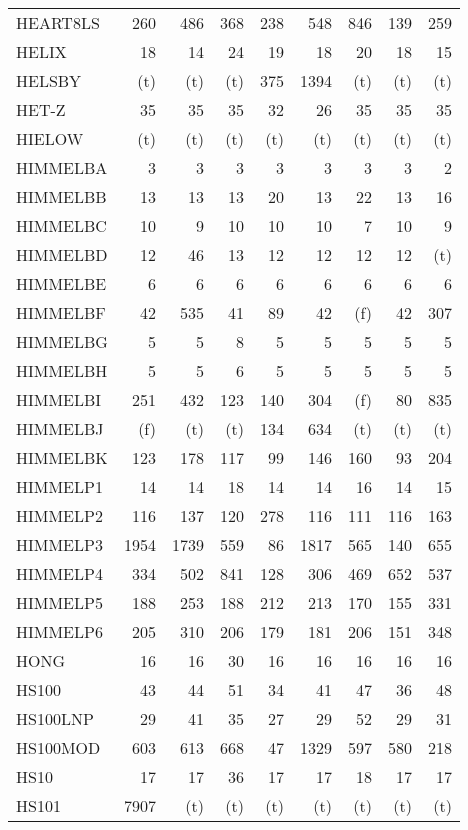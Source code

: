 \documentclass[11pt,twoside]{article}
\begin{document}
{\begin{longtable}[c]{|l|r|r|r|r|r|r|r|r|}
 HEART8LS & 260 & 486 & 368 & 238 & 548 & 846 & 139 & 259 \\
 HELIX & 18 & 14 & 24 & 19 & 18 & 20 & 18 & 15 \\
 HELSBY & (t) & (t) & (t) & 375 & 1394 & (t) & (t) & (t) \\
 HET-Z & 35 & 35 & 35 & 32 & 26 & 35 & 35 & 35 \\
 HIELOW & (t) & (t) & (t) & (t) & (t) & (t) & (t) & (t) \\
 HIMMELBA & 3 & 3 & 3 & 3 & 3 & 3 & 3 & 2 \\
 HIMMELBB & 13 & 13 & 13 & 20 & 13 & 22 & 13 & 16 \\
 HIMMELBC & 10 & 9 & 10 & 10 & 10 & 7 & 10 & 9 \\
 HIMMELBD & 12 & 46 & 13 & 12 & 12 & 12 & 12 & (t) \\
 HIMMELBE & 6 & 6 & 6 & 6 & 6 & 6 & 6 & 6 \\
 HIMMELBF & 42 & 535 & 41 & 89 & 42 & (f) & 42 & 307 \\
 HIMMELBG & 5 & 5 & 8 & 5 & 5 & 5 & 5 & 5 \\
 HIMMELBH & 5 & 5 & 6 & 5 & 5 & 5 & 5 & 5 \\
 HIMMELBI & 251 & 432 & 123 & 140 & 304 & (f) & 80 & 835 \\
 HIMMELBJ & (f) & (t) & (t) & 134 & 634 & (t) & (t) & (t) \\
 HIMMELBK & 123 & 178 & 117 & 99 & 146 & 160 & 93 & 204 \\
 HIMMELP1 & 14 & 14 & 18 & 14 & 14 & 16 & 14 & 15 \\
 HIMMELP2 & 116 & 137 & 120 & 278 & 116 & 111 & 116 & 163 \\
 HIMMELP3 & 1954 & 1739 & 559 & 86 & 1817 & 565 & 140 & 655 \\
 HIMMELP4 & 334 & 502 & 841 & 128 & 306 & 469 & 652 & 537 \\
 HIMMELP5 & 188 & 253 & 188 & 212 & 213 & 170 & 155 & 331 \\
 HIMMELP6 & 205 & 310 & 206 & 179 & 181 & 206 & 151 & 348 \\
 HONG & 16 & 16 & 30 & 16 & 16 & 16 & 16 & 16 \\
 HS100 & 43 & 44 & 51 & 34 & 41 & 47 & 36 & 48 \\
 HS100LNP & 29 & 41 & 35 & 27 & 29 & 52 & 29 & 31 \\
 HS100MOD & 603 & 613 & 668 & 47 & 1329 & 597 & 580 & 218 \\
 HS10 & 17 & 17 & 36 & 17 & 17 & 18 & 17 & 17 \\
 HS101 & 7907 & (t) & (t) & (t) & (t) & (t) & (t) & (t) \\

\end{longtable}}
\end{document}
